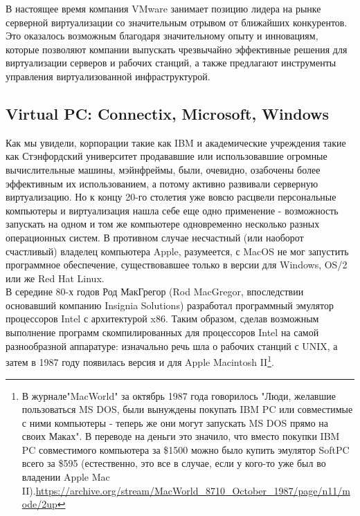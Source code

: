 \documentclass[14pt, a4paper]{article}
\begin{document}
В настоящее время компания VMware занимает позицию лидера на рынке серверной
виртуализации со значительным отрывом от ближайших конкурентов. Это оказалось
возможным благодаря значительному опыту и инновациям, которые позволяют
компании выпускать чрезвычайно эффективные решения для виртуализации серверов
и рабочих станций, а также предлагают инструменты управления виртуализованной
инфраструктурой.\\

\subsection*{Virtual PC: Connectix, Microsoft, Windows}

Как мы увидели, корпорации такие как IBM и академические учреждения такие как
Стэнфордский университет продававшие или использовавшие огромные
вычислительные машины, мэйнфреймы, были, очевидно, озабочены более
эффективным их использованием, а потому активно развивали серверную виртуализацию. Но к концу 20-го столетия уже вовсю расцвели персональные
компьютеры и виртуализация нашла себе еще одно применение - возможность
запускать на одном и том же компьютере одновременно несколько разных
операционных систем. В противном случае несчастный (или наоборот счастливый)
владелец компьютера Apple, разумеется, с MacOS не мог запустить программное
обеспечение, существовавшее только в версии для Windows, OS/2 или же Red Hat
Linux.\\

В середине 80-х годов Род МакГрегор (Rod MacGregor, впоследствии основавший
компанию Insignia Solutions) разработал программный эмулятор процессоров Intel с
архитектурой x86. Таким образом, сделав возможным выполнение программ
скомпилированных для процессоров Intel на самой разнообразной аппаратуре:
изначально речь шла о рабочих станций с UNIX, а затем в 1987 году появилась версия
и для Apple Macintosh II\footnote{В журнале"MacWorld" за октябрь 1987 года говорилось "Люди, желавшие пользоваться MS
DOS, были вынуждены покупать IBM PC или совместимые с ними компьютеры - теперь же они
могут запускать MS DOS прямо на своих Маках". В переводе на деньги это значило, что вместо
покупки IBM PC совместимого компьютера за \$1500 можно было купить эмулятор SoftPC всего
за \$595 (естественно, это все в случае, если у кого-то уже был во владении Apple Mac II).\href{https://archive.org/stream/MacWorld_8710_October_1987/page/n11/mode/2up}{https://archive.org/stream/MacWorld\_8710\_October\_1987/page/n11/mode/2up}}.\\
\end{document}
